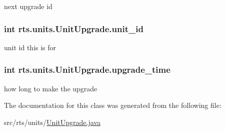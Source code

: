 \label{classrts_1_1units_1_1_unit_upgrade_aaae17d05b9a3bffc0cc1af2ff238f261}
next upgrade id \hypertarget{classrts_1_1units_1_1_unit_upgrade_a77ccd316333875fea8cacc2045ea4224}{
\subsubsection[{unit\_\-id}]{\setlength{\rightskip}{0pt plus 5cm}int {\bf rts.units.UnitUpgrade.unit\_\-id}}}
\label{classrts_1_1units_1_1_unit_upgrade_a77ccd316333875fea8cacc2045ea4224}
unit id this is for \hypertarget{classrts_1_1units_1_1_unit_upgrade_aa7c9ebe81b790184b913f2e56c331698}{
\subsubsection[{upgrade\_\-time}]{\setlength{\rightskip}{0pt plus 5cm}int {\bf rts.units.UnitUpgrade.upgrade\_\-time}}}
\label{classrts_1_1units_1_1_unit_upgrade_aa7c9ebe81b790184b913f2e56c331698}
how long to make the upgrade 

The documentation for this class was generated from the following file:\begin{DoxyCompactItemize}
\item 
src/rts/units/\hyperlink{_unit_upgrade_8java}{UnitUpgrade.java}\end{DoxyCompactItemize}
